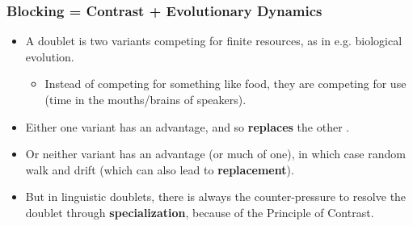 \documentclass[hyperref={pdfpagelabels=false}]{beamer}
\begin{document}
\begin{frame}
\frametitle{Blocking = Contrast + Evolutionary Dynamics}
\begin{itemize}
	\item A doublet is two variants competing for finite resources, as in e.g. biological evolution.
		\begin{itemize} 
			\item Instead of competing for something like food, they are competing for use (time in the mouths/brains of speakers). 
			\end{itemize}
	\item Either one variant has an advantage, and so \textbf{replaces} the other \citep[often following a logistic function;][]{nowak2006}.
	\item Or neither variant has an advantage (or much of one), in which case random walk and drift (which can also lead to \textbf{replacement}).
	\item But in linguistic doublets, there is always the counter-pressure to resolve the doublet through \textbf{specialization}, because of the Principle of Contrast.
\end{itemize}
\end{frame}
\end{document}
